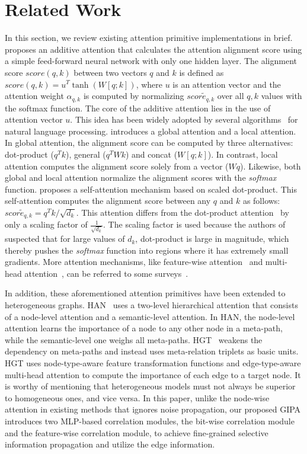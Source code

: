 \documentclass[runningheads]{llncs}
\newcommand{\model}{GIPA\xspace}
\begin{document}
\section{Related Work}
In this section, we review existing attention primitive implementations in brief.
\cite{bahdanau2014neural} proposes an additive attention that calculates the attention alignment score using a simple feed-forward neural network with only one hidden layer.
The alignment score $score(q,k)$ between two vectors $q$ and $k$ is defined as
$score(q,k) = u^T\tanh(W[q;k])$, 
where $u$ is an attention vector and the attention weight $\alpha_{q,k}$ is computed by normalizing $scor\tilde{e}_{q,k}$ over all ${q,k}$ values with the softmax function.
The core of the additive attention lies in the use of attention vector $u$.
This idea has been widely adopted by several algorithms~\cite{yang2016hierarchical,pavlopoulos2017deeper} for natural language processing.
\cite{luong2015effective} introduces a global attention and a local attention.
In global attention, the alignment score can be computed by three alternatives: dot-product ($q^Tk$), general ($q^TWk$) and concat ($W[q;k]$).
In contrast, local attention computes the alignment score solely from a vector ($Wq$).
Likewise, both global and local attention normalize the alignment scores with the \textit{softmax} function.
\cite{vaswani2017attention} proposes a self-attention mechanism based on scaled dot-product.
This self-attention computes the alignment score between any $q$ and $k$ as follows: 
$scor\tilde{e}_{q,k} = {q^Tk}\big/ {\sqrt{d_k}}$. 
This attention differs from the dot-product attention~\cite{luong2015effective} by only a scaling factor of $\frac{1}{\sqrt{d_k}}$.
The scaling factor is used because the authors of~\cite{vaswani2017attention} suspected that for large values of $d_k$, dot-product is large in magnitude, which thereby pushes the \textit{softmax} function into regions where it has extremely small gradients.
More attention mechanisms, like feature-wise attention~\cite{FeatureAtt} and multi-head attention~\cite{vaswani2017attention}, can be referred to some surveys~\cite{attsurvey,NIU202148}.


In addition, these aforementioned attention primitives have been extended to heterogeneous graphs.
HAN~\cite{wang2019heterogeneous} uses a two-level hierarchical attention that consists of a node-level attention and a semantic-level attention.
In HAN, the node-level attention learns the importance of a node to any other node in a meta-path, while the semantic-level one weighs all meta-paths.
HGT~\cite{zhang2019heterogeneous} weakens the dependency on meta-paths and instead uses meta-relation triplets as basic units.
HGT uses node-type-aware feature transformation functions and edge-type-aware multi-head attention to compute the importance of each edge to a target node.
It is worthy of mentioning that heterogeneous models must not always be superior to homogeneous ones, and vice versa. In this paper, unlike the node-wise attention in existing methods that ignores noise propagation, our proposed \model introduces two MLP-based correlation modules, the bit-wise correlation module and the feature-wise correlation module, to achieve fine-grained selective information propagation and utilize the edge information.
\end{document}
